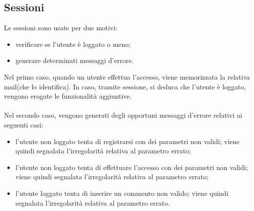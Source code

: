 	\subsection{Sessioni}
	Le sessioni sono usate per due motivi:
	\begin{itemize}
	\item verificare se l'utente è loggato o meno;
	\item generare determinati messaggi d'errore.
	\end{itemize}
	Nel primo caso, quando un utente effettua l'accesso, viene memorizzata la relativa mail(che lo identifica). In caso, tramite sessione, si deduca che l'utente è loggato, vengono erogate le funzionalità aggiuntive. \\ \\
	Nel secondo caso, vengono generati degli opportuni messaggi d'errore relativi ai seguenti casi:
	\begin{itemize}
	\item l'utente non loggato tenta di registrarsi con dei parametri non validi; viene quindi segnalata l'irregolarità relativa al parametro errato;
	\item l'utente non loggato tenta di effettuare l'accesso con dei parametri non validi; viene quindi segnalata l'irregolarità relativa al parametro errato;
	\item l'utente loggato tenta di inserire un commento non valido; viene quindi segnalata l'irregolarità relativa al parametro errato.
	\end{itemize}
	

